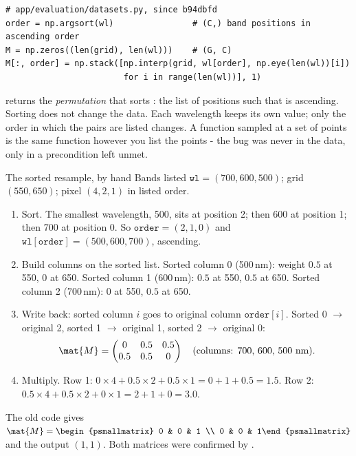 \begin{lstlisting}
# app/evaluation/datasets.py, since b94dbfd
order = np.argsort(wl)                # (C,) band positions in ascending order
M = np.zeros((len(grid), len(wl)))    # (G, C)
M[:, order] = np.stack([np.interp(grid, wl[order], np.eye(len(wl))[i])
                        for i in range(len(wl))], 1)
\end{lstlisting}

 returns the \emph{permutation} that sorts : the list of positions such that
 is ascending. Sorting does not change the data. Each wavelength keeps its own value; only the
order in which the pairs are listed changes. A function sampled at a set of points is the same function however
you list the points - the bug was never in the data, only in a precondition left unmet.

\begin{worked}[label={we:sortbug:fix}]{The sorted resample, by hand}
Bands listed $\mathtt{wl} = (700, 600, 500)$; grid $(550, 650)$; pixel $(4, 2, 1)$ in listed order.
\begin{enumerate}
\item Sort. The smallest wavelength, 500, sits at position 2; then 600 at position 1; then 700 at position 0. So
  $\mathtt{order} = (2, 1, 0)$ and $\mathtt{wl[order]} = (500, 600, 700)$, ascending.
\item Build columns on the sorted list. Sorted column 0 (500\,nm): weight $0.5$ at 550, $0$ at 650. Sorted
  column 1 (600\,nm): $0.5$ at 550, $0.5$ at 650. Sorted column 2 (700\,nm): $0$ at 550, $0.5$ at 650.
\item Write back: sorted column $i$ goes to original column $\mathtt{order}[i]$. Sorted 0 $\to$ original 2,
  sorted 1 $\to$ original 1, sorted 2 $\to$ original 0:
  \[
  \mat{M} = \begin{pmatrix} 0 & 0.5 & 0.5 \\ 0.5 & 0.5 & 0 \end{pmatrix}
  \quad\text{(columns: 700, 600, 500 nm).}
  \]
\item Multiply. Row 1: $0 \times 4 + 0.5 \times 2 + 0.5 \times 1 = 0 + 1 + 0.5 = 1.5$. Row 2:
  $0.5 \times 4 + 0.5 \times 2 + 0 \times 1 = 2 + 1 + 0 = 3.0$.
\end{enumerate}
The old code gives $\mat{M} = \begin{psmallmatrix} 0 & 0 & 1 \\ 0 & 0 & 1\end{psmallmatrix}$ and the
output $(1, 1)$. Both matrices were confirmed by \tagC.
\end{worked}

